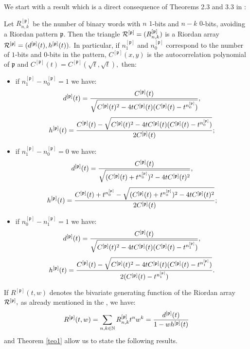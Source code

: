 We start with a result which is a direct consequence of  Theorems 2.3 and 3.3
in \citep{MERLINI20112988}:
\begin{teo}
\label{teo1}
Let  $R_{n,k}^{[\mathfrak{p}]}$ be the number of binary words with $n$ $1$-bits
and $n-k$  $0$-bits, avoiding a Riordan pattern $\mathfrak{p}.$  Then the
triangle ${\cal{R}^{[\mathfrak{p}]}}=(R_{n, k}^{[\mathfrak{p}]})$ is a Riordan
array
${\cal{R}^{[\mathfrak{p}]}}=(d^{[\mathfrak{p}]}(t),h^{[\mathfrak{p}]}(t)).$ In
particular, if  $n_1^{[\mathfrak{p}]}$ and  $n_0^{[\mathfrak{p}]}$ correspond
to the number of $1$-bits  and  $0$-bits in the pattern, $C^{[\mathfrak{p}]}(x,y)$ is
the autocorrelation polynomial of $\mathfrak{p}$ and
$C^{[\mathfrak{p}]}(t)=C^{[\mathfrak{p}]}(\sqrt{t},\sqrt{t}),$ then:
\begin{itemize}

\item if $n_1^{[\mathfrak{p}]}-n_0^{[\mathfrak{p}]}=1$ we have:
$$d^{[\mathfrak{p}]}(t)={C^{[\mathfrak{p}]}(t)
\over \sqrt{C^{[\mathfrak{p}]}(t)^2-4tC^{[\mathfrak{p}]}(t)(C^{[\mathfrak{p}]}(t)-t^{n_0^{[\mathfrak{p}]}})}}, $$
$$h^{[\mathfrak{p}]}(t)={C^{[\mathfrak{p}]}(t) -\sqrt{C^{[\mathfrak{p}]}(t)^2-4tC^{[\mathfrak{p}]}(t)(C^{[\mathfrak{p}]}(t)-t^{n_0^{[\mathfrak{p}]}})}
\over 2 C^{[\mathfrak{p}]}(t)};$$

\item if $n_1^{[\mathfrak{p}]}-n_0^{[\mathfrak{p}]}=0$ we have:
$$d^{[\mathfrak{p}]}(t)={C^{[\mathfrak{p}]}(t)
\over \sqrt{( C^{[\mathfrak{p}]}(t)+t^{n_0^{[\mathfrak{p}]}})^2-4tC^{[\mathfrak{p}]}(t)^2}},$$
$$h^{[\mathfrak{p}]}(t)=
{C^{[\mathfrak{p}]}(t)+ t^{n_0^{[\mathfrak{p}]}} - \sqrt{( C^{[\mathfrak{p}]}(t)+t^{n_0^{[\mathfrak{p}]}})^2-4tC^{[\mathfrak{p}]}(t)^2}
\over 2 C^{[\mathfrak{p}]}(t)};$$

\item if $n_0^{[\mathfrak{p}]}-n_1^{[\mathfrak{p}]}=1$ we have:
$$d^{[\mathfrak{p}]}(t)={C^{[\mathfrak{p}]}(t)
\over \sqrt{C^{[\mathfrak{p}]}(t)^2-4tC^{[\mathfrak{p}]}(t)(C^{[\mathfrak{p}]}(t)-t^{n_1^{[\mathfrak{p}]}})}},$$
$$h^{[\mathfrak{p}]}(t)={C^{[\mathfrak{p}]}(t) -\sqrt{C^{[\mathfrak{p}]}(t)^2-4tC^{[\mathfrak{p}]}(t)(C^{[\mathfrak{p}]}(t)-t^{n_1^{[\mathfrak{p}]}})}
\over 2 (C^{[\mathfrak{p}]}(t)- t^{n_1^{[\mathfrak{p}]}})}.$$

\end{itemize}
\end{teo}

If $R^{[\mathfrak{p}]}(t,w)$ denotes the bivariate generating function of the
Riordan array ${\cal{R}^{[\mathfrak{p}]}},$ as already mentioned in the
, we have:
$$R^{[\mathfrak{p}]}(t,w)=\sum_{n,k\in\mathbb{N}} R_{n, k}^{[\mathfrak{p}]}t^n
w^k={d^{[\mathfrak{p}]}(t) \over 1-wh^{[\mathfrak{p}]}(t)}$$ and Theorem
\ref{teo1} allow us to state the following results.


